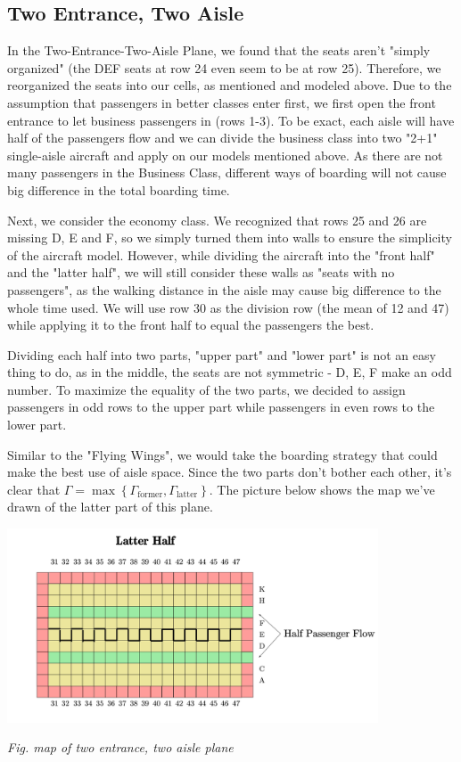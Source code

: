 \documentclass{article}
\begin{document}
	\subsection{Two Entrance, Two Aisle}
	In the Two-Entrance-Two-Aisle Plane, we found that the seats aren't "simply organized" (the DEF seats at row 24 even seem to be at row 25). Therefore, we reorganized the seats into our cells, as mentioned and modeled above. Due to the assumption that passengers in better classes enter first, we first open the front entrance to let business passengers in (rows 1-3). To be exact, each aisle will have half of the passengers flow and we can divide the business class into two "2+1" single-aisle aircraft and apply on our models mentioned above. As there are not many passengers in the Business Class, different ways of boarding will not cause big difference in the total boarding time.

	Next, we consider the economy class. We recognized that rows 25 and 26 are missing D, E and F, so we simply turned them into walls to ensure the simplicity of the aircraft model. However, while dividing the aircraft into the "front half" and the "latter half", we will still consider these walls as "seats with no passengers", as the walking distance in the aisle may cause big difference to the whole time used. We will use row 30 as the division row (the mean of 12 and 47) while applying it to the front half to equal the passengers the best.

	Dividing each half into two parts, "upper part" and "lower part" is not an easy thing to do, as in the middle, the seats are not symmetric - D, E, F make an odd number. To maximize the equality of the two parts, we decided to assign passengers in odd rows to the upper part while passengers in even rows to the lower part.

	Similar to the "Flying Wings", we would take the boarding strategy that could make the best use of aisle space. Since the two parts don't bother each other, it's clear that $\Gamma=\max \left\{\Gamma_\text{former}, \Gamma_\text{latter}\right\}$. The picture below shows the map we've drawn of the latter part of this plane.

	\begin{center}
		\includegraphics[width=11cm]{double.jpg}

		\small \textit{Fig. map of two entrance, two aisle plane}
	\end{center}
\end{document}
